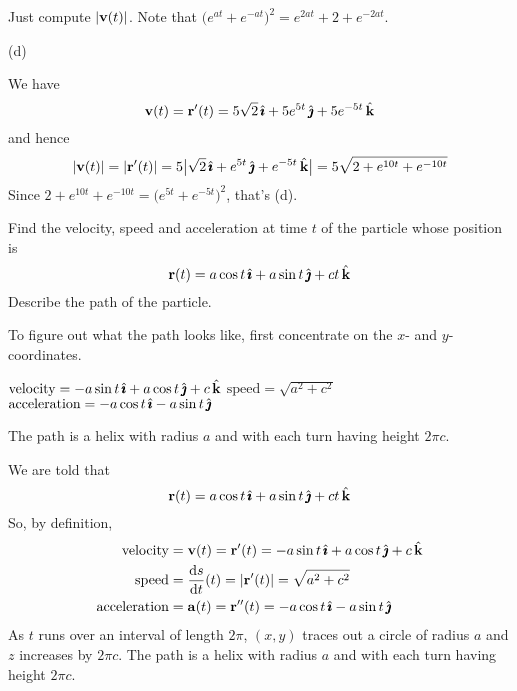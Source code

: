 \begin{hint} 
Just compute $|\mathbf{v}(t)|$. Note that $\big(e^{at}+e^{-at}\big)^2 
=e^{2at} + 2 + e^{-2at}$.
\end{hint}

\begin{answer} 
(d)
\end{answer}

\begin{solution}
We have
\begin{equation*}
\mathbf{v}(t) = \mathbf{r}'(t) 
      = 5 \sqrt{2}\,\hat{\pmb{\imath}} + 5e^{5t}\,\hat{\pmb{\jmath}} +5 e^{-5t}\,\hat{\mathbf{k}}
\end{equation*}
and hence
\begin{equation*}
|\mathbf{v}(t)| = |\mathbf{r}'(t)| 
         = 5 \big|\sqrt{2}\,\hat{\pmb{\imath}} + e^{5t}\,\hat{\pmb{\jmath}} + e^{-5t}\,\hat{\mathbf{k}}\big|
         = 5\sqrt{2+ e^{10t}+ e^{-10t}}
\end{equation*}
Since $2+ e^{10t}+ e^{-10t} = \big(e^{5t}+e^{-5t}\big)^2$, that's (d).
\end{solution}

\begin{question}
Find the velocity, speed and acceleration at time $t$ of
the particle whose position is 
\begin{equation*}
\mathbf{r}(t)= a \cos t\,\hat{\pmb{\imath}}+a\sin t\,\hat{\pmb{\jmath}}+ct\,\hat{\mathbf{k}}
\end{equation*}
Describe the path of the particle.
\end{question}

\begin{hint} 
To figure out what the path looks like, first concentrate on the $x$- and
$y$-coordinates.
\end{hint}

\begin{answer} 
$\text{velocity}=-a \sin t\,\hat{\pmb{\imath}}+a\cos t\,\hat{\pmb{\jmath}}+c\,\hat{\mathbf{k}}$\qquad
$\text{speed}= \sqrt{a^2+c^2}$\qquad
$\text{acceleration}=-a \cos t\,\hat{\pmb{\imath}}-a\sin t\,\hat{\pmb{\jmath}}$

The path is a helix with radius $a$ and with each turn having height $2\pi c$.
\end{answer}

\begin{solution} 
We are told that
\begin{equation*}
\mathbf{r}(t)= a \cos t\,\hat{\pmb{\imath}}+a\sin t\,\hat{\pmb{\jmath}}+ct\,\hat{\mathbf{k}}
\end{equation*}
So, by definition,
\begin{align*}
\text{velocity}&= \vv(t)= \vr'(t)=-a \sin t\,\hi+a\cos t\,\hj+c\,\hk\\
\text{speed}&=\diff{s}{t}(t) = |\vr'(t)| = \sqrt{a^2+c^2} \\
\text{acceleration}&=\va(t)= \vr''(t)=-a \cos t\,\hi-a\sin t\,\hj
\end{align*}
As $t$ runs over an interval of length $2\pi$, $(x,y)$ traces
out a circle of radius $a$ and $z$ increases by $2\pi c$.
The path is a helix with radius $a$ and with each turn having height $2\pi c$.
\end{solution}


